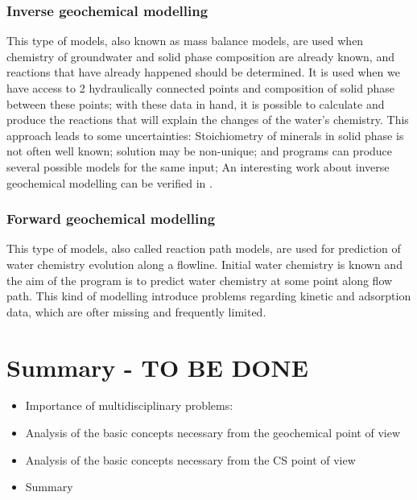 \documentclass[ppgc,mestrado,english]{iiufrgs}
\begin{document}
\subsubsection{Inverse geochemical modelling}
This type of models, also known as mass balance models, are used when chemistry of groundwater and solid phase composition are already known, and reactions that have already happened should be determined. It is used when we have access to 2 hydraulically connected points and composition of solid phase between these points; with these data in hand, it is possible to calculate and produce the reactions that will explain the changes of the water's chemistry. This approach leads to some uncertainties: Stoichiometry of minerals in solid phase is not often well known; solution may be non-unique; and programs can produce several possible models for the same input;
An interesting work about inverse geochemical modelling can be verified in \cite{Sharif:07}.
\subsubsection{Forward geochemical modelling}
This type of models, also called reaction path models, are used for prediction of water chemistry evolution along a flowline. Initial water chemistry is known and the aim of the program is to predict water chemistry at some point along flow path. This kind of modelling introduce problems regarding kinetic and adsorption data, which are ofter missing and frequently limited. 

\section{Summary - TO BE DONE}
\begin{itemize}
\item Importance of multidisciplinary problems:
\item  Analysis of the basic concepts necessary from the geochemical point of view
\item Analysis of the basic concepts necessary from the CS point of view
\item Summary
\end{itemize}


\end{document}
